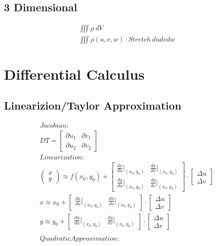 \documentclass{article}
\begin{document}
\subsection{3 Dimensional}
\begin{gather*}
\iiint \rho\ dV \\
\iiint \rho(u,v,w)\cdot Stretch\ dudvdw
\end{gather*}
\section{Differential Calculus}
\subsection{Linearizion/Taylor Approximation}
\begin{gather*}
Jacobian: \\
DT = \left[\begin{matrix}
\partial u_1 & \partial v_1 \\
\partial u_2 & \partial v_2
\end{matrix}\right] \\
Linearization: \\
\left(\begin{matrix}
x \\ y
\end{matrix}\right) \approx f(x_0, y_0) + 
\left[\begin{matrix}
\frac{dx}{du}|_{(x_0,y_0)} & \frac{dx}{dv}|_{(x_0,y_0)} \\
\frac{dy}{du}|_{(x_0,y_0)} & \frac{dy}{dv}|_{(x_0,y_0)}
\end{matrix}\right] \cdot \left[\begin{matrix}
\Delta u \\ \Delta v
\end{matrix}\right]\\
x \approx x_0 + \left[\begin{matrix}
\frac{dx}{du}|_{(x_0,y_0)} & \frac{dx}{dv}|_{(x_0,y_0)}
\end{matrix}\right] \cdot \left[\begin{matrix}
\Delta u \\ \Delta v
\end{matrix}\right]\\
y \approx y_0 + \left[\begin{matrix}
\frac{dy}{du}|_{(x_0,y_0)} & \frac{dy}{dv}|_{(x_0,y_0)}
\end{matrix}\right] \cdot \left[\begin{matrix}
\Delta u \\ \Delta v
\end{matrix}\right]\\
\\
Quadratic Approximation:
\end{gather*}
\end{document}
